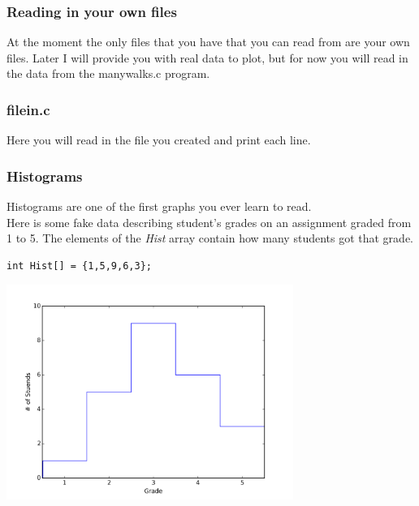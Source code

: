 \documentclass{beamer}
\begin{document}
\begin{frame}[fragile]
  \frametitle{Reading in your own files}
  At the moment the only files that you have that 
  you can read from are your own files.
  Later I will provide you with real data to plot, 
  but for now you will read in the
  data from the manywalks.c program.
\end{frame}

\begin{frame}
  \frametitle{filein.c}
  Here you will read in the file you created and print each line.
  
\end{frame}

\begin{frame}[fragile]
  \frametitle{Histograms}
  Histograms are one of the first graphs you ever learn to read.\\
  Here is some fake data describing student's grades on an assignment
  graded from 1 to 5. The elements of the \textit{Hist} array contain
  how many students got that grade.
  \begin{lstlisting}[style=customc]
    int Hist[] = {1,5,9,6,3};
  \end{lstlisting}
  \centering
  \includegraphics[width=0.7\textwidth]{histogram.png}

\end{frame}
\end{document}
